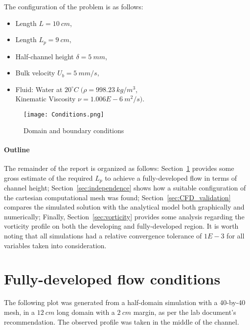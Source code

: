 \documentclass[12pt]{article}
\begin{document}
        The configuration of the problem is as follows:
        \begin{itemize}
                \item Length \( L = 10 \: cm \),
                \item Length \( L_p = 9 \: cm \),
                \item Half-channel height \(\delta = 5 \: mm\),
                \item Bulk velocity \( U_b = 5 \: mm/s \),
                \item Fluid: Water at \( 20^{\circ}C \; ( \rho = 998.23 \: kg/m^3\), \\ Kinematic Viscosity \( \nu = 1.006E-6 \: m^2/s ) \).
        \end{itemize}

        \begin{figure}[!ht]
                \texttt{[image: Conditions.png]}
                \centering
                \caption{Domain and boundary conditions}
                \label{fig:conditions}
        \end{figure}

        \paragraph{Outline}
        The remainder of the report is organized as follows: Section~\ref{sec:developed_flow} provides some gross estimate of the required \( L_p \) to achieve a fully-developed flow in terms of channel height; Section~\ref{sec:independence} shows how a suitable configuration of the cartesian computational mesh was found; Section~\ref{sec:CFD_validation} compares the simulated solution with the analytical model both graphically and numerically; Finally, Section~\ref{sec:vorticity} provides some analysis regarding the vorticity profile on both the developing and fully-developed region. It is worth noting that all simulations had a relative convergence tolerance of $ 1E-3 $ for all variables taken into consideration.

\section{Fully-developed flow conditions} \label{sec:developed_flow}

        The following plot was generated from a half-domain simulation with a 40-by-40 mesh, in a $ 12 \: cm $ long domain with a $ 2 \: cm $ margin, as per the lab document's recommendation. The observed profile was taken in the middle of the channel.
\end{document}

